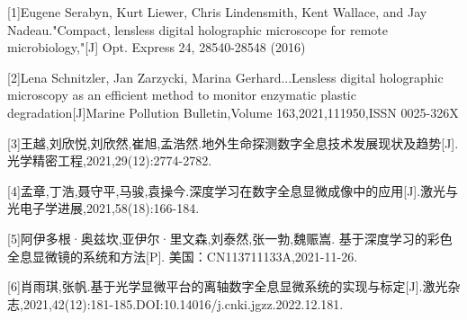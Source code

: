 \documentclass{article}
\begin{document}
	[1]Eugene Serabyn, Kurt Liewer, Chris Lindensmith, Kent Wallace, and Jay Nadeau."Compact, lensless digital holographic microscope for remote microbiology,"[J] Opt. Express 24, 28540-28548 (2016)
	
	
	[2]Lena Schnitzler, Jan Zarzycki, Marina Gerhard...Lensless digital holographic microscopy as an efficient method to monitor enzymatic plastic degradation[J]Marine Pollution Bulletin,Volume 163,2021,111950,ISSN 0025-326X
	
	
	[3]王越,刘欣悦,刘欣然,崔旭,孟浩然.地外生命探测数字全息技术发展现状及趋势[J].光学精密工程,2021,29(12):2774-2782.
	
	
	[4]孟章,丁浩,聂守平,马骏,袁操今.深度学习在数字全息显微成像中的应用[J].激光与光电子学进展,2021,58(18):166-184.
	
	
	[5]阿伊多根·奥兹坎,亚伊尔·里文森,刘泰然,张一勃,魏赈嵩. 基于深度学习的彩色全息显微镜的系统和方法[P]. 美国：CN113711133A,2021-11-26.
	
	
	[6]肖雨琪,张帆.基于光学显微平台的离轴数字全息显微系统的实现与标定[J].激光杂志,2021,42(12):181-185.DOI:10.14016/j.cnki.jgzz.2022.12.181.
\end{document}
